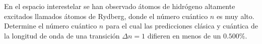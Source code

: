 \item En el espacio interestelar se han observado átomos de hidrógeno altamente excitados llamados átomos de Rydberg, donde el número cuántico $n$ es muy alto. Determine el número cuántico $n$ para el cual las predicciones clásica y cuántica de la longitud de onda de una transición $\Delta n = 1$ difieren en menos de un $0.500\%$.